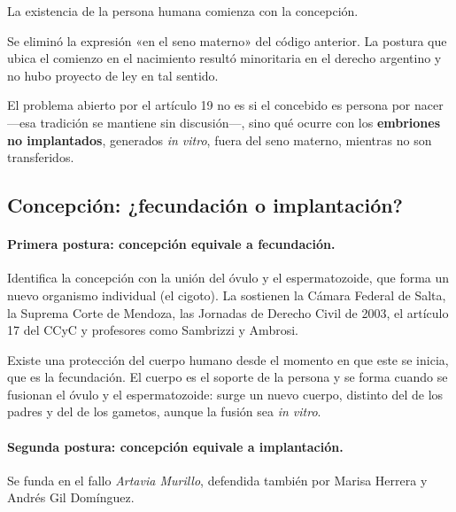 \documentclass[12pt,oneside]{book}
\begin{document}
\begin{regla}
La existencia de la persona humana comienza con la concepción.
\end{regla}

Se eliminó la expresión «en el seno materno» del código anterior. La postura que ubica el comienzo en el nacimiento resultó minoritaria en el derecho argentino y no hubo proyecto de ley en tal sentido.

\begin{importante}
El problema abierto por el artículo 19 no es si el concebido es persona por nacer ---esa tradición se mantiene sin discusión---, sino qué ocurre con los \textbf{embriones no implantados}, generados \textit{in vitro}, fuera del seno materno, mientras no son transferidos.
\end{importante}

\subsection{Concepción: ¿fecundación o implantación?}

\paragraph{Primera postura: concepción equivale a fecundación.} Identifica la concepción con la unión del óvulo y el espermatozoide, que forma un nuevo organismo individual (el cigoto). La sostienen la Cámara Federal de Salta, la Suprema Corte de Mendoza, las Jornadas de Derecho Civil de 2003, el artículo 17 del CCyC y profesores como Sambrizzi y Ambrosi.

\begin{regla}
Existe una protección del cuerpo humano desde el momento en que este se inicia, que es la fecundación. El cuerpo es el soporte de la persona y se forma cuando se fusionan el óvulo y el espermatozoide: surge un nuevo cuerpo, distinto del de los padres y del de los gametos, aunque la fusión sea \textit{in vitro}.
\end{regla}

\paragraph{Segunda postura: concepción equivale a implantación.} Se funda en el fallo \textit{Artavia Murillo}, defendida también por Marisa Herrera y Andrés Gil Domínguez.
\end{document}
